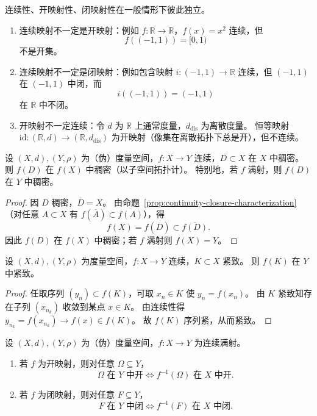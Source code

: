 \documentclass[lang=cn,a4paper,newtx,section]{elegantbook}
\begin{document}
\begin{remark}
  连续性、开映射性、闭映射性在一般情形下彼此独立。
  \begin{enumerate}
    \item 连续映射不一定是开映射：例如 $f:\mathbb{R}\to\mathbb{R}$，$f(x)=x^2$ 连续，但
    \[
      f((-1,1))=[0,1)
    \]
    不是开集。

    \item 连续映射不一定是闭映射：例如包含映射 $i:(-1,1)\to\mathbb{R}$ 连续，但 $(-1,1)$ 在 $(-1,1)$ 中闭，而
    \[
      i((-1,1))=(-1,1)
    \]
    在 $\mathbb{R}$ 中不闭。

    \item 开映射不一定连续：令 $d$ 为 $\mathbb{R}$ 上通常度量，$d_{\mathrm{dis}}$ 为离散度量。
    恒等映射 $\mathrm{id}:(\mathbb{R},d)\to(\mathbb{R},d_{\mathrm{dis}})$ 为开映射（像集在离散拓扑下总是开），但不连续。
  \end{enumerate}
\end{remark}

\begin{proposition}
  设 $(X,d),(Y,\rho)$ 为（伪）度量空间，$f:X\to Y$ 连续，$D\subset X$ 在 $X$ 中稠密。
  则 $f(D)$ 在 $f(X)$ 中稠密（以子空间拓扑计）。
  特别地，若 $f$ 满射，则 $f(D)$ 在 $Y$ 中稠密。
\end{proposition}

\begin{proof}
  因 $D$ 稠密，$\overline{D}=X$。
  由命题~\ref{prop:continuity-closure-characterization}（对任意 $A\subset X$ 有 $f(\overline{A})\subset\overline{f(A)}$），得
  \[
    f(X)=f(\overline{D})\subset \overline{f(D)}.
  \]
  因此 $f(D)$ 在 $f(X)$ 中稠密；若 $f$ 满射则 $f(X)=Y$。
\end{proof}

\begin{theorem}
  设 $(X,d),(Y,\rho)$ 为度量空间，$f:X\to Y$ 连续，$K\subset X$ 紧致。
  则 $f(K)$ 在 $Y$ 中紧致。
\end{theorem}

\begin{proof}
  任取序列 $(y_n)\subset f(K)$，可取 $x_n\in K$ 使 $y_n=f(x_n)$。
  由 $K$ 紧致知存在子列 $(x_{n_k})$ 收敛到某点 $x\in K$。
  由连续性得 $y_{n_k}=f(x_{n_k})\to f(x)\in f(K)$。
  故 $f(K)$ 序列紧，从而紧致。
\end{proof}
\begin{proposition}
  设 $(X,d),(Y,\rho)$ 为（伪）度量空间，$f:X\to Y$ 为连续满射。
  \begin{enumerate}
    \item 若 $f$ 为开映射，则对任意 $\Omega\subseteq Y$，
    \[
      \Omega\text{ 在 }Y\text{ 中开}\iff f^{-1}(\Omega)\text{ 在 }X\text{ 中开}.
    \]
    \item 若 $f$ 为闭映射，则对任意 $F\subseteq Y$，
    \[
      F\text{ 在 }Y\text{ 中闭}\iff f^{-1}(F)\text{ 在 }X\text{ 中闭}.
    \]
  \end{enumerate}
\end{proposition}
\end{document}
